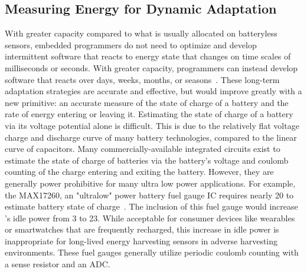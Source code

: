 \subsection{Measuring Energy for Dynamic Adaptation}
With greater capacity compared to what is usually allocated on batteryless sensors, embedded programmers do not need to optimize and develop intermittent software that reacts to energy state that changes on time scales of milliseconds or seconds. With greater capacity, programmers can instead develop software that reacts over days, weeks, months, or seasons~\cite{ahmed2019optimal}.
These long-term adaptation strategies are accurate and effective, but would improve greatly with a new primitive: an accurate measure of the state of charge of a battery and the rate of energy entering or leaving it.
Estimating the state of charge of a battery via its voltage potential alone is difficult. 
This is due to the relatively flat voltage charge and discharge curve of many battery technologies, compared to the linear curve of capacitors.
Many commercially-available integrated circuits exist to estimate the state of charge of batteries via the battery's voltage and coulomb counting of the charge entering and exiting the battery.
However, they are generally power prohibitive for many ultra low power applications. 
For example, the MAX17260, an "ultralow" power battery fuel gauge IC requires nearly 20\ssi{\micro\watt} to estimate battery state of charge~\cite{max17260}.
The inclusion of this fuel gauge would increase \name{}'s idle power from 3\ssi{\micro\watt} to 23\ssi{\micro\watt}.
While acceptable for consumer devices like wearables or smartwatches that are frequently recharged, this increase in idle power is inappropriate for long-lived energy harvesting sensors in adverse harvesting environments. 
These fuel gauges generally utilize periodic coulomb counting with a sense resistor and an ADC. 

